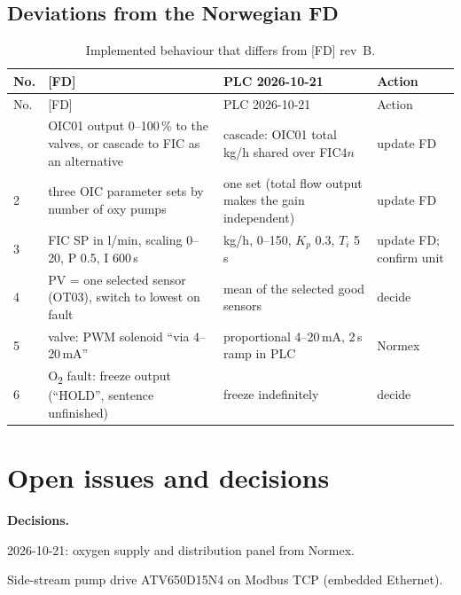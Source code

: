 \documentclass[11pt,a4paper]{article}
\newcommand{\Otwo}{O\textsubscript{2}}
\begin{document}
\subsection{Deviations from the Norwegian FD}
\begin{small}
\begin{longtable}{@{}P{8mm}P{58mm}P{58mm}P{28mm}@{}}
\caption{Implemented behaviour that differs from [FD] rev~B.}\label{tab:dev}\\
\toprule
No. & [FD] & PLC 2026-10-21 & Action \\
\midrule
\endfirsthead
\toprule
No. & [FD] & PLC 2026-10-21 & Action \\
\midrule
\endhead
\bottomrule
{} & OIC01 output 0--100\,\% to the valves, or cascade to FIC as an alternative & cascade: OIC01 total kg/h shared over FIC4$n$ & update FD \\
2 & three OIC parameter sets by number of oxy pumps & one set (total flow output makes the gain independent) & update FD \\
3 & FIC SP in l/min, scaling 0--20, P 0.5, I 600\,s & kg/h, 0--150, $K_p$ 0.3, $T_i$ 5\,s & update FD; confirm unit \\
4 & PV = one selected sensor (OT03), switch to lowest on fault & mean of the selected good sensors & decide \\
5 & valve: PWM solenoid ``via 4--20\,mA'' & proportional 4--20\,mA, 2\,s ramp in PLC & Normex \\
6 & \Otwo{} fault: freeze output (``HOLD'', sentence unfinished) & freeze indefinitely & decide \\
\end{longtable}
\end{small}

\section{Open issues and decisions}
\label{sec:open}

\textbf{Decisions.}
\begin{description}[nosep, leftmargin=12mm, style=sameline]
  \item[DEC1] 2026-10-21: oxygen supply and distribution panel from Normex.
  \item[DEC2] Side-stream pump drive ATV650D15N4 on Modbus TCP (embedded Ethernet).
\end{description}
\end{document}
